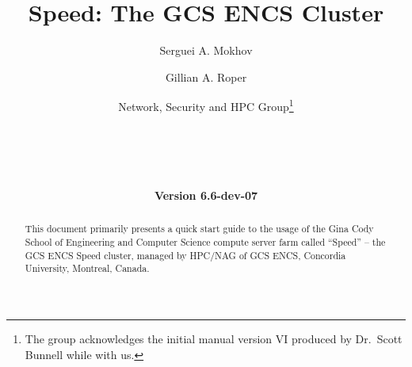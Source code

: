 \documentclass{easychair}
\begin{document}
%
\title{Speed: The GCS ENCS Cluster}

%

\date{\textbf{Version 6.6-dev-07}}

%
\author{
    Serguei A. Mokhov
\and
    Gillian A. Roper
\and
    Network, Security and HPC Group\footnote{The group acknowledges the initial manual version VI produced by Dr.~Scott Bunnell while with us.}\\
    \\
    \\
    \\
    \\
}

%

\maketitle

\begin{abstract}
This document primarily presents a quick start
guide to the usage of the Gina Cody School of
Engineering and Computer Science compute server farm
called ``Speed'' -- the GCS ENCS Speed cluster,
managed by HPC/NAG of GCS ENCS, Concordia University,
Montreal, Canada.
\end{abstract}

\tableofcontents
\clearpage
\end{document}
